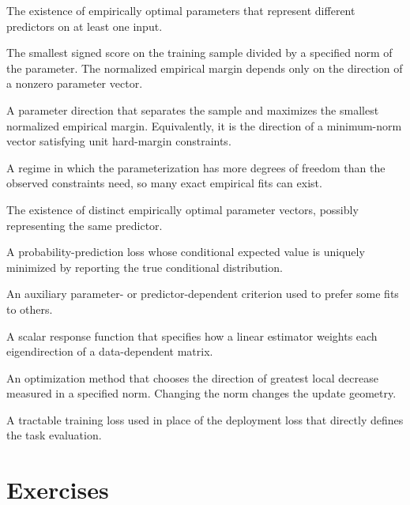 \documentclass[11pt,twoside]{article}
\theoremstyle{definition}
\theoremstyle{remark}
\begin{document}
\begin{description}[style=nextline,leftmargin=1.5em,labelindent=0pt]
The existence of empirically optimal parameters that represent different
predictors on at least one input.
\item[Normalized empirical margin]
The smallest signed score on the training sample divided by a specified norm
of the parameter. The normalized empirical margin depends only on the
direction of a nonzero parameter vector.
\item[Max-margin separator]
A parameter direction that separates the sample and maximizes the smallest
normalized empirical margin. Equivalently, it is the direction of a
minimum-norm vector satisfying unit hard-margin constraints.
\item[Overparameterized]
A regime in which the parameterization has more degrees of freedom than the
observed constraints need, so many exact empirical fits can exist.
\item[Parameter-space non-uniqueness]
The existence of distinct empirically optimal parameter vectors, possibly
representing the same predictor.
\item[Strictly proper scoring rule]
A probability-prediction loss whose conditional expected value is uniquely
minimized by reporting the true conditional distribution.
\item[Regularizer]
An auxiliary parameter- or predictor-dependent criterion used to prefer some
fits to others.
\item[Spectral filter]
A scalar response function that specifies how a linear estimator weights
each eigendirection of a data-dependent matrix.
\item[Steepest descent]
An optimization method that chooses the direction of greatest local decrease
measured in a specified norm. Changing the norm changes the update geometry.
\item[Surrogate loss]
A tractable training loss used in place of the deployment loss that directly
defines the task evaluation.
\end{description}

\section{Exercises}
\label{sec:exercises}

\exerciseinstructions
\setcounter{courseexercise}{0}









\end{document}
